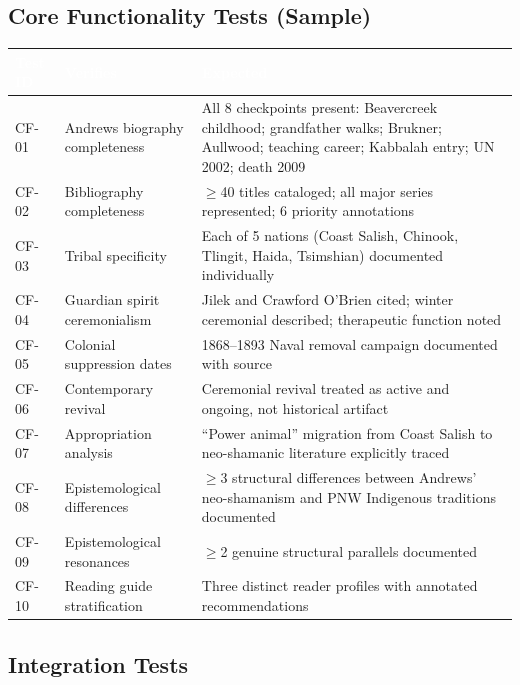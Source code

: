 \documentclass[11pt,letterpaper]{article}
\newcommand{\tableheader}[1]{\textbf{\sffamily\textcolor{white}{#1}}}
\begin{document}
\subsection{Core Functionality Tests (Sample)}

\begin{center}
\begin{tabularx}{\textwidth}{C{1.5cm}L{3.5cm}X}
\toprule
{}
\tableheader{Test ID} & \tableheader{Verifies} & \tableheader{Expected} \\
\midrule
CF-01 & Andrews biography completeness & All 8 checkpoints present: Beavercreek childhood; grandfather walks; Brukner; Aullwood; teaching career; Kabbalah entry; UN 2002; death 2009 \\
CF-02 & Bibliography completeness & $\geq$40 titles cataloged; all major series represented; 6 priority annotations \\
CF-03 & Tribal specificity & Each of 5 nations (Coast Salish, Chinook, Tlingit, Haida, Tsimshian) documented individually \\
CF-04 & Guardian spirit ceremonialism & Jilek and Crawford O'Brien cited; winter ceremonial described; therapeutic function noted \\
CF-05 & Colonial suppression dates & 1868--1893 Naval removal campaign documented with source \\
CF-06 & Contemporary revival & Ceremonial revival treated as active and ongoing, not historical artifact \\
CF-07 & Appropriation analysis & ``Power animal'' migration from Coast Salish to neo-shamanic literature explicitly traced \\
CF-08 & Epistemological differences & $\geq$3 structural differences between Andrews' neo-shamanism and PNW Indigenous traditions documented \\
CF-09 & Epistemological resonances & $\geq$2 genuine structural parallels documented \\
CF-10 & Reading guide stratification & Three distinct reader profiles with annotated recommendations \\
\bottomrule
\end{tabularx}
\end{center}

\subsection{Integration Tests}
\end{document}

